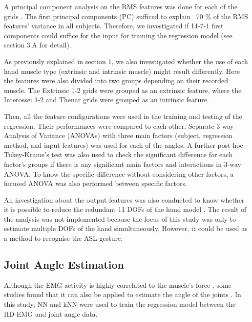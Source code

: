 \documentclass[conference]{IEEEtran}
\begin{document}
A principal component analysis on the RMS features was done for each of the grids \cite{b9}. The first 
principal components (PC) sufficed to explain ~70 \% of the RMS features’ variance in all subjects.
Therefore, we investigated if 14-7-1 first components could suffice for the input for training the regression 
model (see section 3.A for detail).

As previously explained in section 1, we also investigated whether the use of each hand muscle type 
(extrinsic and intrinsic muscle) might result differently. Here the features were also divided into two groups 
depending on their recorded muscle. The Extrinsic 1-2 grids were grouped as an extrinsic feature, where the 
Interossei 1-2 and Thenar grids were grouped as an intrinsic feature.

Then, all the feature configurations were used in the training and testing of the regression. Their 
performances were compared to each other. Separate 3-way Analysis of Variance (ANOVAs) with three 
main factors (subject, regression method, and input features) was used for each of the angles. A further post 
hoc Tukey-Krame’s test was also used to check the significant difference for each factor’s groups if there is 
any significant main factors and interactions in 3-way ANOVA. To know the specific difference without 
considering other factors, a focused ANOVA was also performed between specific factors.

An investigation about the output features was also conducted to know whether it is possible to reduce 
the redundant 11 DOFs of the hand model \cite{b32}\cite{b28}. The result of the analysis was not implemented because
the focus of this study was only to estimate multiple DOFs of the hand simultaneously. However, it could
be used as a method to recognise the ASL gesture.

\subsection{Joint Angle Estimation}
Although the EMG activity is highly correlated to the muscle’s force \cite{b2}\cite{b24}, some studies found that 
it can also be applied to estimate the angle of the joints \cite{b9}\cite{b16}. In this study, NN and kNN were used to train 
the regression model between the HD-EMG and joint angle data.
\end{document}
